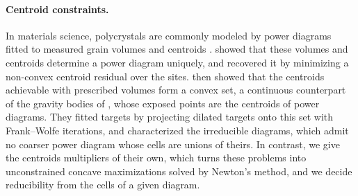 \documentclass[main.tex]{subfiles}
\begin{document}
\paragraph{Centroid constraints.}
In materials science, polycrystals are commonly modeled by power diagrams fitted to measured grain volumes and centroids \cite{Lyckegaard2011Laguerre, Quey2018Optimal, Spettl2016Fitting, Petrich2019Reconstruction, Alpers2023GrainMaps}.
\citet{Bourne2025Inverting} showed that these volumes and centroids determine a power diagram uniquely, and recovered it by minimizing a non-convex centroid residual over the sites.
\citet{Bourne2026ConvexOrder} then showed that the centroids achievable with prescribed volumes form a convex set, a continuous counterpart of the gravity bodies of \citet{Brieden2012GravityBodies}, whose exposed points are the centroids of power diagrams.
They fitted targets by projecting dilated targets onto this set with Frank--Wolfe iterations, and characterized the irreducible diagrams, which admit no coarser power diagram whose cells are unions of theirs.
In contrast, we give the centroids multipliers of their own, which turns these problems into unconstrained concave maximizations solved by Newton's method, and we decide reducibility from the cells of a given diagram.
\end{document}
